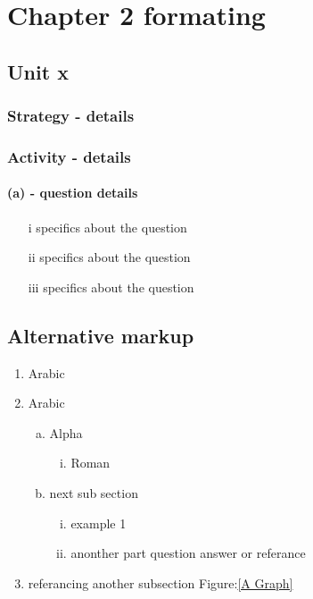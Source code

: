\documentclass[fleqn]{report}
\begin{document}
\chapter{Chapter 2 formating}
\section{Unit x}

\subsection{Strategy - details}

\subsection{Activity - details}

\subsubsection{(a) - question details}

\begin{itemize}
\item[i] specifics about the question
\item[ii] specifics about the question
\item[iii] specifics about the question
\end{itemize}
\clearpage

\section{Alternative markup} %

\begin{enumerate}
	\item Arabic
	\item Arabic
	\begin{enumerate}[(a)]%
		\item Alpha
			\begin{enumerate}[(i)]
				\item Roman
			\end{enumerate}
		\item next sub section
			\begin{enumerate}[(i)]
				\item example 1
				\item anonther part question answer or referance
			\end{enumerate}	
	\end{enumerate}
	\item referancing another subsection Figure:\ref{A Graph}
\end{enumerate}
\end{document}
